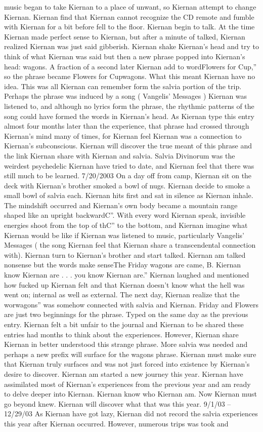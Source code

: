 \documentclass[12pt]{book}
\begin{document}
music began to take Kiernan to a place of unwant, so Kiernan attempt to change Kiernan. Kiernan find that Kiernan cannot recognize the CD remote and fumble with Kiernan for a bit before fell to the floor. Kiernan begin to talk. At the time Kiernan made perfect sense to Kiernan, but after a minute of talked, Kiernan realized Kiernan was just said gibberish. Kiernan shake Kiernan's head and try to think of what Kiernan was said but then a new phrase popped into Kiernan's head: wagons. A fraction of a second later Kiernan add to wordFlowers for Cup,'' so the phrase became Flowers for Cupwagons. What this meant Kiernan have no idea. This was all Kiernan can remember form the salvia portion of the trip. Perhaps the phrase was induced by a song ( Vangelis' Messages ) Kiernan was listened to, and although no lyrics form the phrase, the rhythmic patterns of the song could have formed the words in Kiernan's head. As Kiernan type this entry almost four months later than the experience, that phrase had crossed through Kiernan's mind many of times, for Kiernan feel Kiernan was a connection to Kiernan's subconscious. Kiernan will discover the true meant of this phrase and the link Kiernan share with Kiernan and salvia. Salvia Divinorum was the weirdest psychedelic Kiernan have tried to date, and Kiernan feel that there was still much to be learned. 7/20/2003 On a day off from camp, Kiernan sit on the deck with Kiernan's brother smoked a bowl of nugs. Kiernan decide to smoke a small bowl of salvia each. Kiernan hits first and sat in silence as Kiernan inhale. The mindshift occurred and Kiernan's own body became a mountain range shaped like an upright backwardC''. With every word Kiernan speak, invisible energies shoot from the top of thC'' to the bottom, and Kiernan imagine what Kiernan would be like if Kiernan was listened to music, particularly Vangelis' Messages ( the song Kiernan feel that Kiernan share a transcendental connection with). Kiernan turn to Kiernan's brother and start talked. Kiernan am talked nonsense but the words make senseThe Friday wagons are came, B. Kiernan know Kiernan are . . . you know Kiernan are.'' Kiernan laughed and mentioned how fucked up Kiernan felt and that Kiernan doesn't know what the hell was went on; internal as well as external. The next day, Kiernan realize that the worwagons'' was somehow connected with salvia and Kiernan. Friday and Flowers are just two beginnings for the phrase. Typed on the same day as the previous entry. Kiernan felt a bit unfair to the journal and Kiernan to be shared these entries had months to think about the experiences. However, Kiernan share Kiernan in better understood this strange phrase. More salvia was needed and perhaps a new prefix will surface for the wagons phrase. Kiernan must make sure that Kiernan truly surfaces and was not just forced into existence by Kiernan's desire to discover. Kiernan am started a new journey this year. Kiernan have assimilated most of Kiernan's experiences from the previous year and am ready to delve deeper into Kiernan. Kiernan know who Kiernan am. Now Kiernan must go beyond knew. Kiernan will discover what that was this year. 9/1/03 -- 12/29/03 As Kiernan have got lazy, Kiernan did not record the salvia experiences this year after Kiernan occurred. However, numerous trips was took and 
\end{document}
